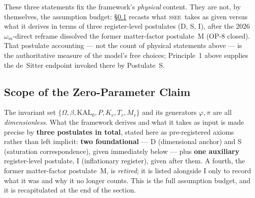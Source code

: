 \documentclass[12pt,a4paper]{article}
\newcommand{\SSEE}{\ifmmode\mathrm{SSEE}\else\textsc{ssee}\fi}
\newcommand{\KALz}{\mathrm{KAL}_0}
\begin{document}
These three statements fix the framework's \emph{physical} content. They are
not, by themselves, the assumption budget: §\ref{sec:scope} recasts what \SSEE\
takes as given versus what it derives in terms of three register-level postulates
(D, S, I), after the 2026 $\omega_m$-direct reframe dissolved the former
matter-factor postulate~M (OP-8 closed). That postulate accounting --- not the
count of physical statements above --- is the authoritative measure of the model's
free choices; Principle~1 above supplies the de~Sitter endpoint invoked there by
Postulate~S.

\subsection{Scope of the Zero-Parameter Claim}
\label{sec:scope}

The invariant set $\{\Omega,\beta,\KALz,P,K_v,T_r,M_v\}$ and its generators
$\varphi,\pi$ are all \emph{dimensionless}. What the framework derives and what
it takes as input is made precise by \textbf{three postulates in total}, stated
here as pre-registered axioms rather than left implicit: \textbf{two
foundational} --- D (dimensional anchor) and S (saturation correspondence),
given immediately below --- plus \textbf{one auxiliary} register-level
postulate, I (inflationary register), given after them. A fourth, the former
matter-factor postulate~M, is \emph{retired}; it is listed alongside I only to
record what it was and why it no longer counts. This is the full assumption
budget, and it is recapitulated at the end of the section.
\end{document}
